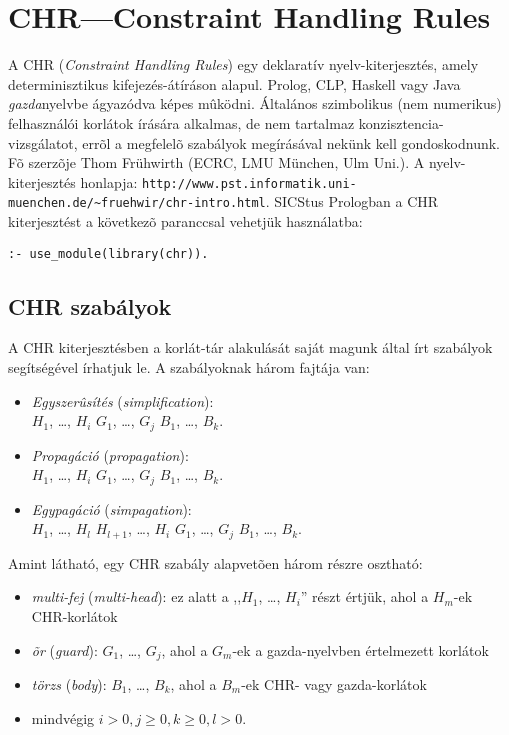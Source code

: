 \clearpage

\section{CHR---Constraint Handling Rules}

A CHR (\emph{Constraint Handling Rules}) egy deklaratív nyelv-kiterjesztés,
amely determinisztikus kifejezés-átíráson alapul. Prolog, CLP, Haskell
vagy Java \emph{gazda}nyelvbe ágyazódva képes mûködni. Általános szimbolikus
(nem numerikus) felhasználói korlátok írására alkalmas, de nem tartalmaz
konzisztencia-vizsgálatot, errõl a megfelelõ szabályok megírásával
nekünk kell gondoskodnunk. Fõ szerzõje Thom Frühwirth (ECRC, LMU München, Ulm Uni.).
\br
A nyelv-kiterjesztés honlapja:
\verb'http://www.pst.informatik.uni-muenchen.de/~fruehwir/chr-intro.html'.
\br
SICStus Prologban a CHR kiterjesztést a következõ paranccsal vehetjük használatba:
\begin{verbatim}
:- use_module(library(chr)).
\end{verbatim}

\subsection{CHR szabályok}

A CHR kiterjesztésben a korlát-tár alakulását saját magunk által írt szabályok
segítségével írhatjuk le. A szabályoknak három fajtája van:

\begin{itemize}
\item \emph{Egyszerûsítés} (\emph{simplification}):\\
 $H_1$, \ldots, $H_i$ \cd{<=>} $G_1$, \ldots, $G_j$ \cd{|} $B_1$,
 \ldots, $B_k$.
\item \emph{Propagáció} (\emph{propagation}):\\
 $H_1$, \ldots, $H_i$ \cd{==>} $G_1$, \ldots, $G_j$ \cd{|} $B_1$,
 \ldots, $B_k$. 
\item \emph{Egypagáció} (\emph{simpagation}):\\
 $H_1$, \ldots, $H_l$ \cd{\bs} $H_{l+1}$, \ldots, $H_i$ \cd{==>} $G_1$, \ldots, $G_j$ \cd{|} $B_1$,
 \ldots, $B_k$. 
\end{itemize}

Amint látható, egy CHR szabály alapvetõen három részre osztható:

\begin{itemize}
\item \emph{multi-fej} (\emph{multi-head}): ez alatt a ,,$H_1$, \ldots, $H_i$'' részt
értjük, ahol a $H_m$-ek CHR-korlátok
\item \emph{õr} (\emph{guard}): $G_1$, \ldots, $G_j$, ahol a $G_m$-ek a gazda-nyelvben
értelmezett korlátok
\item \emph{törzs} (\emph{body}): $B_1$, \ldots, $B_k$, ahol a $B_m$-ek CHR- vagy
gazda-korlátok
\item mindvégig $i > 0, j \geq 0, k \geq 0, l > 0$.
\end{itemize}

